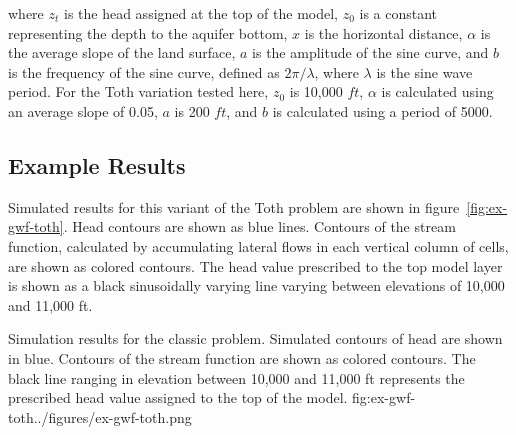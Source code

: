 \noindent where $z_t$ is the head assigned at the top of the model, $z_0$ is a constant representing the depth to the aquifer bottom, $x$ is the horizontal distance, $\alpha$ is the average slope of the land surface, $a$ is the amplitude of the sine curve, and $b$ is the frequency of the sine curve, defined as $2 \pi / \lambda$, where $\lambda$ is the sine wave period.  For the Toth variation tested here, $z_0$ is 10,000 $ft$, $\alpha$ is calculated using an average slope of 0.05, $a$ is 200 $ft$, and $b$ is calculated using a period of 5000.

\subsection{Example Results}

Simulated results for this variant of the Toth problem are shown in figure~\ref{fig:ex-gwf-toth}.  Head contours are shown as blue lines.  Contours of the stream function, calculated by accumulating lateral flows in each vertical column of cells, are shown as colored contours.  The head value prescribed to the top model layer is shown as a black sinusoidally varying line varying between elevations of 10,000 and 11,000 ft.

\begin{StandardFigure}{
                                     Simulation results for the classic \cite{toth1963} problem.
                                     Simulated contours of head are shown in blue.
                                     Contours of the stream function are shown as colored contours.
                                     The black line ranging in elevation between 10,000 and 11,000 ft 
                                     represents the prescribed head value assigned to the top of the model.
                                     }{fig:ex-gwf-toth}{../figures/ex-gwf-toth.png}
\end{StandardFigure}                                 


